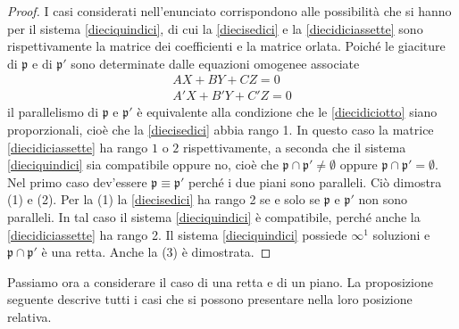 \documentclass{article}
\theoremstyle{plain}
\theoremstyle{definition}
\theoremstyle{remark}
\begin{document}
\begin{proof}
I casi considerati nell'enunciato corrispondono alle possibilità che si hanno per il sistema \ref{dieciquindici}, di cui la \ref{diecisedici} e la \ref{diecidiciassette} sono rispettivamente la matrice dei coefficienti e la matrice orlata.
Poiché le giaciture di $\mathfrak{p}$ e di $\mathfrak{p}'$ sono determinate dalle equazioni omogenee associate
\begin{equation}\label{diecidiciotto}
    \begin{matrix}
        AX + BY + CZ = 0 \\
        A'X + B'Y + C'Z = 0     
    \end{matrix}
\end{equation}
il parallelismo di $\mathfrak{p}$ e $\mathfrak{p}'$ è equivalente alla condizione che le \ref{diecidiciotto} siano proporzionali, 
cioè che la \ref{diecisedici} abbia rango 1. In questo caso la matrice \ref{diecidiciassette} ha rango $1$ o $2$ rispettivamente, 
a seconda che il sistema \ref{dieciquindici} sia compatibile oppure no, cioè che $\mathfrak{p} \cap \mathfrak{p}' \neq \emptyset$ 
oppure $\mathfrak{p} \cap \mathfrak{p}' = \emptyset$. Nel primo caso dev'essere $\mathfrak{p} \equiv \mathfrak{p}'$ perché 
i due piani sono paralleli. Ciò dimostra (1) e (2). Per la (1) la \ref{diecisedici} ha rango 2 se e solo se $\mathfrak{p}$ e $\mathfrak{p}'$ non sono paralleli. 
In tal caso il sistema \ref{dieciquindici} è compatibile, perché anche la \ref{diecidiciassette} ha rango 2. 
Il sistema \ref{dieciquindici} possiede $\infty^1$ soluzioni e $\mathfrak{p} \cap \mathfrak{p}'$ è una retta. 
Anche la (3) è dimostrata.    
\end{proof}

\vspace{10pt}

Passiamo ora a considerare il caso di una retta e di un piano. La proposizione seguente descrive tutti i casi che si possono presentare nella loro posizione relativa.

\vspace{10pt}
\end{document}
